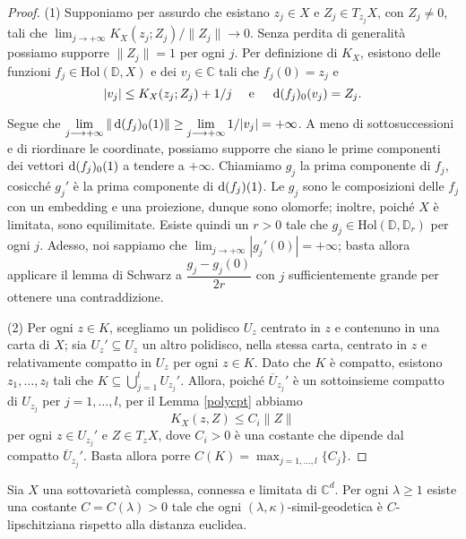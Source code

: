 \begin{proof}
    (1) Supponiamo per assurdo che esistano $z_j \in X$ e $Z_j \in T_{z_j}X$, con $Z_j\not=0$, tali che $\displaystyle \lim_{j \longrightarrow +\infty} K_X(z_j;Z_j)/\|Z_j\| \longrightarrow 0$. Senza perdita di generalità possiamo supporre $\|Z_j\|=1$ per ogni $j$. Per definizione di $K_X$, esistono delle funzioni $f_j\in\text{Hol}(\mathbb{D},X)$ e dei $v_j \in \mathbb{C}$ tali che $f_j(0)=z_j$ e
    $$|v_j| \le K_X(z_j;Z_j)+1/j\quad\text{ e }\quad \mathop{}\!\mathrm{d} (f_j)_0(v_j)=Z_j.$$

    Segue che $\displaystyle \lim_{j \longrightarrow +\infty}\|\mathop{}\!\mathrm{d}(f_j)_0(1)\| \ge \lim_{j \longrightarrow +\infty}1/|v_j|=+\infty$. A meno di sottosuccessioni e di riordinare le coordinate, possiamo supporre che siano le prime componenti dei vettori $\mathop{}\!\mathrm{d}(f_j)_0(1)$ a tendere a $+\infty$. Chiamiamo $g_j$ la prima componente di $f_j$, cosicché $g_j'$ è la prima componente di $\mathop{}\!\mathrm{d}(f_j)(1)$. Le $g_j$ sono le composizioni delle $f_j$ con un embedding e una proiezione, dunque sono olomorfe; inoltre, poiché $X$ è limitata, sono equilimitate. Esiste quindi un $r>0$ tale che $g_j \in \text{Hol}(\mathbb{D},\mathbb{D}_r)$ per ogni $j$. Adesso, noi sappiamo che $\displaystyle\lim_{j\longrightarrow +\infty} |g_j'(0)|=+\infty$; basta allora applicare il lemma di Schwarz a $\dfrac{g_j-g_j(0)}{2r}$ con $j$ sufficientemente grande per ottenere una contraddizione.

    (2) Per ogni $z \in K$, scegliamo un polidisco $U_z$ centrato in $z$ e contenuno in una carta di $X$; sia $U_z'\subseteq U_z$ un altro polidisco, nella stessa carta, centrato in $z$ e relativamente compatto in $U_z$ per ogni $z \in K$. Dato che $K$ è compatto, esistono $z_1,\dots,z_l$ tali che $K\subseteq\displaystyle\bigcup_{j=1}^l U_{z_j}'$. Allora, poiché $\overline{U}_{z_j}'$ è un sottoinsieme compatto di $U_{z_j}$ per $j=1,\dots,l$, per il Lemma \ref{polycpt} abbiamo
    $$K_X(z,Z) \le C_i\|Z\|$$
    per ogni $z \in U_{z_j}'$ e $Z\in T_zX$, dove $C_i>0$ è una costante che dipende dal compatto $\overline{U}_{z_j}'$. Basta allora porre $C(K)=\displaystyle\max_{j=1,\dots,l}\{C_j\}$.
\end{proof}

\begin{prop} \label{simillip}
    Sia $X$ una sottovarietà complessa, connessa e limitata di $\mathbb{C}^d$. Per ogni $\lambda \ge 1$ esiste una costante $C=C(\lambda)>0$ tale che ogni $(\lambda,\kappa)$-simil-geodetica è $C$-lipschitziana rispetto alla distanza euclidea.
\end{prop}

